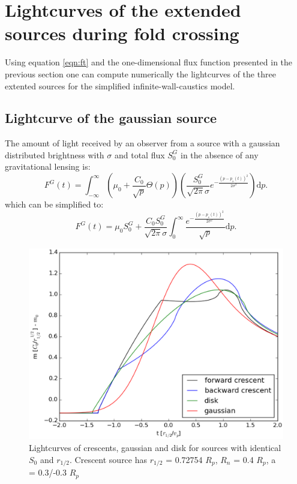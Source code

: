 \section{Lightcurves of the extended sources during fold crossing}

Using equation \ref{eqn:ft} and the one-dimensional flux function presented in the previous section one can compute numerically the lightcurves of the three extented sources for the simplified 
infinite-wall-caustics model.

\subsection{Lightcurve of the gaussian source}

The amount of light received by an observer from a source with a gaussian distributed brightness with $\sigma$ and total flux $S_0^G$ in the absence of any gravitational lensing is:
\begin{equation}
 F^G(t) = \int_{-\infty}^\infty  \left( \mu_0 + \frac{C_0}{\sqrt{p}} \Theta \left( p \right) \right) \left( \frac{S_0^G}{\sqrt{2 \pi} \sigma} e^{-\frac{(p-p_s(t))^2}{2 \sigma^2}} \right) \mathrm{d}p.
\end{equation}
which can be simplified to:
\begin{equation}
 F^G(t) = \mu_0 S_0^G + \frac{C_0 S_0^G}{\sqrt{2\pi} \sigma} \int_{0}^\infty \frac{e^{-\frac{(p-p_s(t))^2}{2 \sigma^2}}}{\sqrt{p}} \mathrm{d}p.
\end{equation}


\begin{figure}
\includegraphics[width = .8\textwidth]{plots/4source_magnification.eps}
\caption{\label{fig:lightcurve_gauss} Lightcurves of crescents, gaussian and disk for sources with identical $S_0$ and $r_{1/2}$. Crescent source has $r_{1/2}$ = 0.72754 $R_p$, $R_n$ = 0.4 $R_p$, a = 0.3/-0.3 $R_p$ }
\end{figure}


